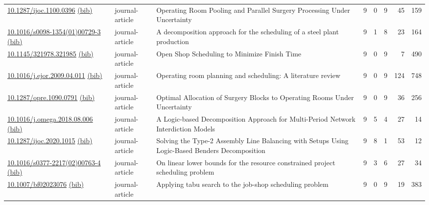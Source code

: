 {\begin{longtable}{p{5cm}lp{11cm}rrrrr}
\href{http://dx.doi.org/10.1287/ijoc.1100.0396}{10.1287/ijoc.1100.0396} \href{https://www.doi2bib.org/bib/10.1287/ijoc.1100.0396}{(bib)} & journal-article & Operating Room Pooling and Parallel Surgery Processing Under Uncertainty & 9 & 0 & 9 & 45 & 159 \\
\href{http://dx.doi.org/10.1016/s0098-1354(01)00729-3}{10.1016/s0098-1354(01)00729-3} \href{https://www.doi2bib.org/bib/10.1016/s0098-1354(01)00729-3}{(bib)} & journal-article & A decomposition approach for the scheduling of a steel plant production & 9 & 1 & 8 & 23 & 164 \\
\href{http://dx.doi.org/10.1145/321978.321985}{10.1145/321978.321985} \href{https://www.doi2bib.org/bib/10.1145/321978.321985}{(bib)} & journal-article & Open Shop Scheduling to Minimize Finish Time & 9 & 0 & 9 & 7 & 490 \\
\href{http://dx.doi.org/10.1016/j.ejor.2009.04.011}{10.1016/j.ejor.2009.04.011} \href{https://www.doi2bib.org/bib/10.1016/j.ejor.2009.04.011}{(bib)} & journal-article & Operating room planning and scheduling: A literature review & 9 & 0 & 9 & 124 & 748 \\
\href{http://dx.doi.org/10.1287/opre.1090.0791}{10.1287/opre.1090.0791} \href{https://www.doi2bib.org/bib/10.1287/opre.1090.0791}{(bib)} & journal-article & Optimal Allocation of Surgery Blocks to Operating Rooms Under Uncertainty & 9 & 0 & 9 & 36 & 256 \\
\href{http://dx.doi.org/10.1016/j.omega.2018.08.006}{10.1016/j.omega.2018.08.006} \href{https://www.doi2bib.org/bib/10.1016/j.omega.2018.08.006}{(bib)} & journal-article & A Logic-based Decomposition Approach for Multi-Period Network Interdiction Models & 9 & 5 & 4 & 27 & 14 \\
\href{http://dx.doi.org/10.1287/ijoc.2020.1015}{10.1287/ijoc.2020.1015} \href{https://www.doi2bib.org/bib/10.1287/ijoc.2020.1015}{(bib)} & journal-article & Solving the Type-2 Assembly Line Balancing with Setups Using Logic-Based Benders Decomposition & 9 & 8 & 1 & 53 & 12 \\
\href{http://dx.doi.org/10.1016/s0377-2217(02)00763-4}{10.1016/s0377-2217(02)00763-4} \href{https://www.doi2bib.org/bib/10.1016/s0377-2217(02)00763-4}{(bib)} & journal-article & On linear lower bounds for the resource constrained project scheduling problem & 9 & 3 & 6 & 27 & 34 \\
\href{http://dx.doi.org/10.1007/bf02023076}{10.1007/bf02023076} \href{https://www.doi2bib.org/bib/10.1007/bf02023076}{(bib)} & journal-article & Applying tabu search to the job-shop scheduling problem & 9 & 0 & 9 & 19 & 383 \\

\end{longtable}}
